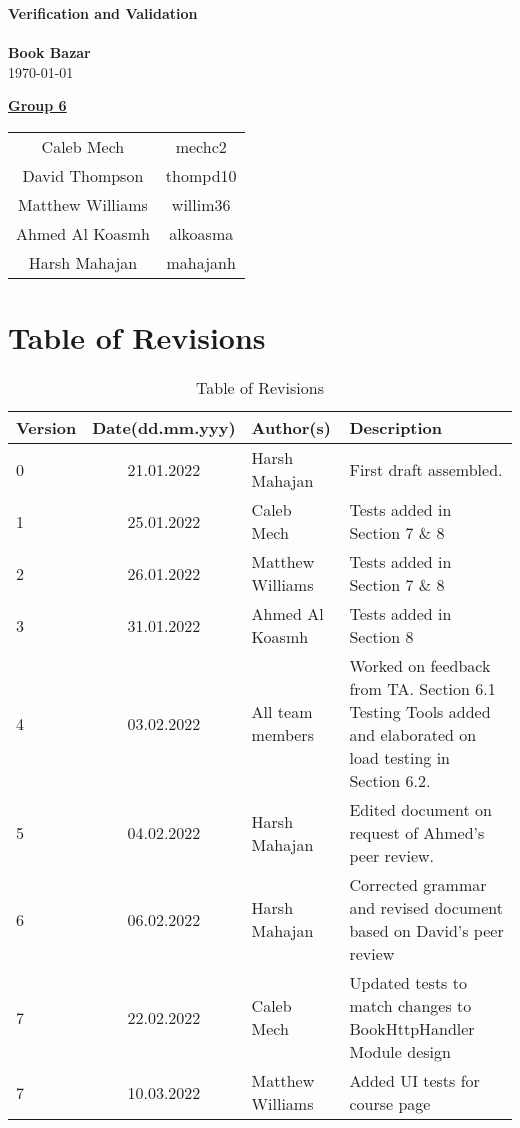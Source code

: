 \documentclass[fullpage]{article}
\begin{document}
\vspace*{\fill}
\begin{center}

  {\Huge \textbf{Verification and Validation}}\\
\hrulefill\\[2mm]
  {\huge \textbf{Book Bazar}}\\[2mm]
{\large \today}\\[15mm]
{\large
\underline{\textbf{Group 6}}\\
\begin{tabular}{ c c }

 Caleb Mech & mechc2\\ 
 David Thompson & thompd10\\
 Matthew Williams & willim36\\
 Ahmed Al Koasmh & alkoasma\\
 Harsh Mahajan	& mahajanh    
\end{tabular}
}

\end{center}

\vspace*{\fill}

\newpage
\begingroup
\hypersetup{hidelinks}
\tableofcontents

\listoffigures
\listoftables
\endgroup
\newpage

\section{Table of Revisions}
\begin{table}[h]
\centering
\begin{tabular}{| l | c | p{4cm}| p{5cm}|}
\hline
 \rowcolor{lightgray} 
\textbf{Version} & \textbf{Date(dd.mm.yyy)} &\textbf{Author(s)} &\textbf{Description}\\
\hline
0 & 21.01.2022 & Harsh Mahajan & First draft assembled.\\
\hline
1 & 25.01.2022 & Caleb Mech & Tests added in Section 7 \& 8\\
\hline
2 & 26.01.2022 & Matthew Williams & Tests added in Section 7 \& 8\\
\hline
3 & 31.01.2022 & Ahmed Al Koasmh & Tests added in Section 8\\
\hline
4& 03.02.2022& All team members & Worked on feedback from TA. Section 6.1 Testing Tools added and elaborated on load testing in Section 6.2.\\
\hline
5& 04.02.2022& Harsh Mahajan & Edited document on request of Ahmed's peer review.\\
\hline
6& 06.02.2022& Harsh Mahajan& Corrected grammar and revised document based on David's peer review\\
\hline
7& 22.02.2022& Caleb Mech & Updated tests to match changes to BookHttpHandler Module design\\
\hline
7& 10.03.2022& Matthew Williams & Added UI tests for course page\\
\hline
\end{tabular}
\caption{Table of Revisions}

\end{table}
\end{document}
